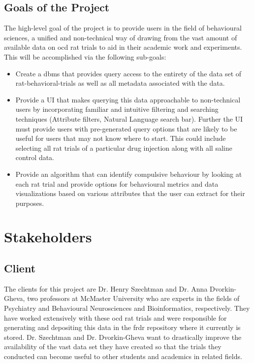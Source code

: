 \documentclass[12pt]{article}
\begin{document}
\subsection{Goals of the Project}

\par{The high-level goal of the project is to provide users in the field of behavioural sciences,
a unified and non-technical way of drawing from the vast amount of available data on \gls{ocd} rat trials
to aid in their academic work and experiments. This will be accomplished via the following sub-goals:}

\begin{itemize}
    \item Create a \gls{dbms} that provides \gls{query} access to the entirety of the data set of \gls{rat-behavioral-trials} as well as all \gls{metadata} associated with the data.
    \item Provide a UI that makes querying this data approachable to non-technical users by incorporating familiar and intuitive filtering and searching techniques
    (Attribute filters, Natural Language search bar). Further the UI must provide users with pre-generated query options that are likely to
    be useful for users that may not know where to start. This could include selecting all rat trials of a particular drug injection along with
    all saline control data.
    \item Provide an algorithm that can identify compulsive behaviour by looking at each rat trial
    and provide options for behavioural metrics and data visualizations based on various attributes that the user can extract 
    for their purposes.
\end{itemize}



\section{Stakeholders}

\subsection{Client}
\label{sec:2.1client}
\par{The clients for this project are Dr. Henry Szechtman and Dr. Anna Dvorkin-Gheva, two professors at McMaster University who are experts in
the fields of Psychiatry and Behavioural Neurosciences and Bioinformatics, respectively. They have worked extensively with these \gls{ocd} rat trials and
were responsible for generating and depositing this data in the \gls{frdr} repository where it currently is stored. Dr. Szechtman and Dr. Dvorkin-Gheva want
to drastically improve the availability of the vast data set they have created so that the trials they conducted can become useful to other students and academics in related fields. \\\\}
\end{document}

